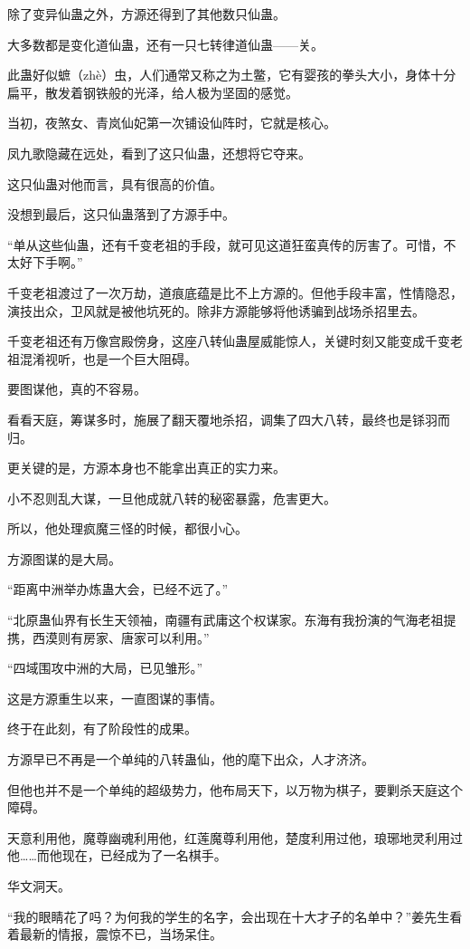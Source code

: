 \begin{this_body}
除了变异仙蛊之外，方源还得到了其他数只仙蛊。

大多数都是变化道仙蛊，还有一只七转律道仙蛊——关。

此蛊好似蟅（zhè）虫，人们通常又称之为土鳖，它有婴孩的拳头大小，身体十分扁平，散发着钢铁般的光泽，给人极为坚固的感觉。

当初，夜煞女、青岚仙妃第一次铺设仙阵时，它就是核心。

凤九歌隐藏在远处，看到了这只仙蛊，还想将它夺来。

这只仙蛊对他而言，具有很高的价值。

没想到最后，这只仙蛊落到了方源手中。

“单从这些仙蛊，还有千变老祖的手段，就可见这道狂蛮真传的厉害了。可惜，不太好下手啊。”

千变老祖渡过了一次万劫，道痕底蕴是比不上方源的。但他手段丰富，性情隐忍，演技出众，卫风就是被他坑死的。除非方源能够将他诱骗到战场杀招里去。

千变老祖还有万像宫殿傍身，这座八转仙蛊屋威能惊人，关键时刻又能变成千变老祖混淆视听，也是一个巨大阻碍。

要图谋他，真的不容易。

看看天庭，筹谋多时，施展了翻天覆地杀招，调集了四大八转，最终也是铩羽而归。

更关键的是，方源本身也不能拿出真正的实力来。

小不忍则乱大谋，一旦他成就八转的秘密暴露，危害更大。

所以，他处理疯魔三怪的时候，都很小心。

方源图谋的是大局。

“距离中洲举办炼蛊大会，已经不远了。”

“北原蛊仙界有长生天领袖，南疆有武庸这个权谋家。东海有我扮演的气海老祖提携，西漠则有房家、唐家可以利用。”

“四域围攻中洲的大局，已见雏形。”

这是方源重生以来，一直图谋的事情。

终于在此刻，有了阶段性的成果。

方源早已不再是一个单纯的八转蛊仙，他的麾下出众，人才济济。

但他也并不是一个单纯的超级势力，他布局天下，以万物为棋子，要剿杀天庭这个障碍。

天意利用他，魔尊幽魂利用他，红莲魔尊利用他，楚度利用过他，琅琊地灵利用过他……而他现在，已经成为了一名棋手。

华文洞天。

“我的眼睛花了吗？为何我的学生的名字，会出现在十大才子的名单中？”姜先生看着最新的情报，震惊不已，当场呆住。


\end{this_body}
